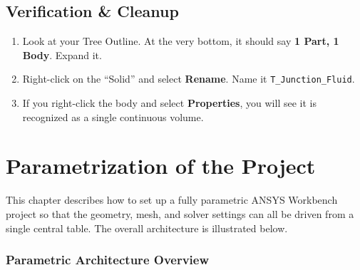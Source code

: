 \documentclass[12pt,a4paper]{report}
\begin{document}
\section{Verification \& Cleanup}

\begin{enumerate}
  \item Look at your Tree Outline. At the very bottom, it should say \textbf{1 Part, 1 Body}. Expand it.
  \item Right-click on the ``Solid'' and select \textbf{Rename}. Name it \texttt{T\_Junction\_Fluid}.
  \item If you right-click the body and select \textbf{Properties}, you will see it is recognized as a single continuous volume.
\end{enumerate}

\medskip
\noindent{}


\chapter{Parametrization of the Project}

This chapter describes how to set up a fully parametric ANSYS Workbench project so that the geometry, mesh, and solver settings can all be driven from a single central table. The overall architecture is illustrated below.

\subsection*{Parametric Architecture Overview}
\end{document}
